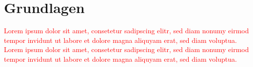 \section{Grundlagen} \label{sec:basics}
\textcolor{red}{Lorem ipsum dolor sit amet, consetetur sadipscing elitr, sed diam nonumy eirmod tempor invidunt ut labore et dolore magna aliquyam erat, sed diam voluptua. Lorem ipsum dolor sit amet, consetetur sadipscing elitr, sed diam nonumy eirmod tempor invidunt ut labore et dolore magna aliquyam erat, sed diam voluptua.}





\newpage
